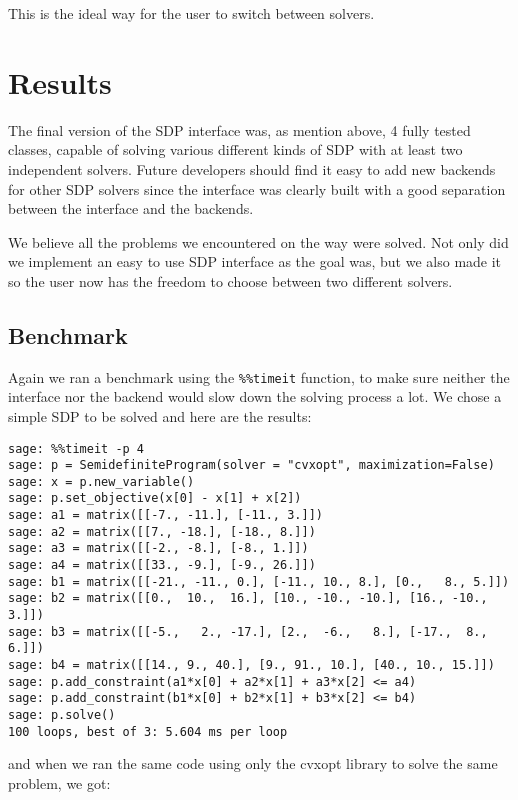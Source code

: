 This is the ideal way for the user to switch between solvers.






\section{Results}
The final version of the SDP interface was, as mention above, 4 fully tested classes, capable of solving various different kinds of SDP with at least two independent solvers. Future developers should find it easy to add new backends for other SDP solvers since the interface was clearly built with a good separation between the interface and the backends.

We believe all the problems we encountered on the way were solved. Not only did we implement an easy to use SDP interface as the goal was, but we also made it so the user now has the freedom to choose between two different solvers.   


	\subsection{Benchmark}
	Again we ran a benchmark using the \texttt{\%\%timeit} function, to make sure neither the interface nor the backend would slow down the solving process a lot. We chose a simple SDP to be solved and here are the results:
	
	
\begin{verbatim}
sage: %%timeit -p 4
sage: p = SemidefiniteProgram(solver = "cvxopt", maximization=False)
sage: x = p.new_variable()
sage: p.set_objective(x[0] - x[1] + x[2])
sage: a1 = matrix([[-7., -11.], [-11., 3.]])
sage: a2 = matrix([[7., -18.], [-18., 8.]])
sage: a3 = matrix([[-2., -8.], [-8., 1.]])
sage: a4 = matrix([[33., -9.], [-9., 26.]])
sage: b1 = matrix([[-21., -11., 0.], [-11., 10., 8.], [0.,   8., 5.]])
sage: b2 = matrix([[0.,  10.,  16.], [10., -10., -10.], [16., -10., 3.]])
sage: b3 = matrix([[-5.,   2., -17.], [2.,  -6.,   8.], [-17.,  8., 6.]])
sage: b4 = matrix([[14., 9., 40.], [9., 91., 10.], [40., 10., 15.]])
sage: p.add_constraint(a1*x[0] + a2*x[1] + a3*x[2] <= a4)
sage: p.add_constraint(b1*x[0] + b2*x[1] + b3*x[2] <= b4)
sage: p.solve()
100 loops, best of 3: 5.604 ms per loop
\end{verbatim}

and when we ran the same code using only the cvxopt library to solve the same problem, we got:


